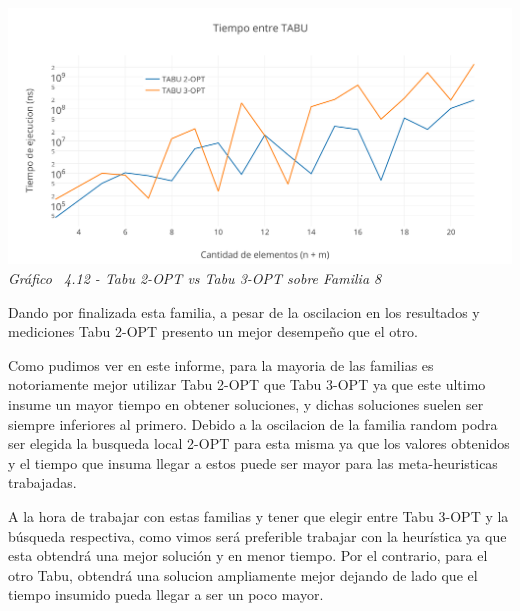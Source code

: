 \vspace*{0.3cm} \vspace*{0.3cm}
  \begin{center}
 \includegraphics[scale=0.5]{./EJ4/medicionrandom.png}\\
 {            \textit{Gráfico \ 4.12 - Tabu 2-OPT vs Tabu 3-OPT sobre Familia 8}}
  \end{center}
  \vspace*{0.3cm}
  
Dando por finalizada esta familia, a pesar de la oscilacion en los resultados y mediciones Tabu 2-OPT presento un mejor desempeño que el otro. 

Como pudimos ver en este informe, para la mayoria de las familias es notoriamente mejor utilizar Tabu 2-OPT que Tabu 3-OPT ya que este ultimo insume un mayor tiempo en obtener soluciones, y dichas soluciones suelen ser siempre inferiores al primero.
Debido a la oscilacion de la familia random podra ser elegida la busqueda local 2-OPT para esta misma ya que los valores obtenidos y el tiempo que insuma llegar a estos puede ser mayor para las meta-heuristicas trabajadas.

A la hora de trabajar con estas familias y tener que elegir entre Tabu 3-OPT y la b\'usqueda respectiva, como vimos ser\'a preferible trabajar con la heur\'istica ya que esta obtendr\'a una mejor soluci\'on y en menor tiempo. Por el contrario, para el otro Tabu, obtendr\'a una solucion ampliamente mejor dejando de lado que el tiempo insumido pueda llegar a ser un poco mayor.


